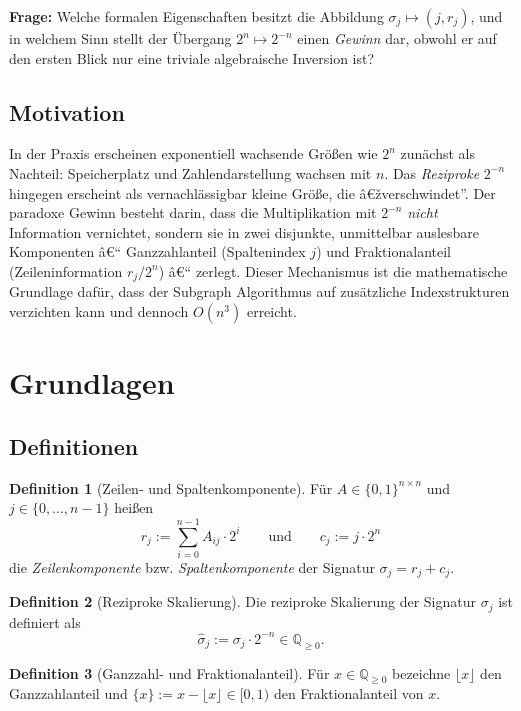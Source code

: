 ﻿\documentclass[a4paper,12pt]{article}
\theoremstyle{definition}
\newtheorem{definition}{Definition}
\begin{document}
\textbf{Frage:} Welche formalen Eigenschaften besitzt die Abbildung
$\sigma_j \mapsto (j, r_j)$, und in welchem Sinn stellt der Übergang
$2^n \mapsto 2^{-n}$ einen \emph{Gewinn} dar, obwohl er auf den ersten Blick
nur eine triviale algebraische Inversion ist?

\subsection{Motivation}

In der Praxis erscheinen exponentiell wachsende Größen wie $2^n$ zunächst
als Nachteil: Speicherplatz und Zahlendarstellung wachsen mit $n$. Das
\emph{Reziproke} $2^{-n}$ hingegen erscheint als vernachlässigbar kleine Größe,
die â€žverschwindet''. Der paradoxe Gewinn besteht darin, dass die
Multiplikation mit $2^{-n}$ \emph{nicht} Information vernichtet, sondern
sie in zwei disjunkte, unmittelbar auslesbare Komponenten â€“ Ganzzahlanteil
(Spaltenindex $j$) und Fraktionalanteil (Zeileninformation $r_j / 2^n$) â€“
zerlegt. Dieser Mechanismus ist die mathematische Grundlage dafür, dass der
Subgraph Algorithmus auf zusätzliche Indexstrukturen verzichten kann und
dennoch $O(n^3)$ erreicht.

\section{Grundlagen}

\subsection{Definitionen}

\begin{definition}[Zeilen- und Spaltenkomponente]
	Für $A \in \{0,1\}^{n\times n}$ und $j \in \{0,\ldots,n-1\}$ heißen
	\[
		r_j := \sum_{i=0}^{n-1} A_{ij}\cdot 2^i
		\qquad\text{und}\qquad
		c_j := j \cdot 2^n
	\]
	die \emph{Zeilenkomponente} bzw. \emph{Spaltenkomponente} der Signatur
	$\sigma_j = r_j + c_j$.
\end{definition}

\begin{definition}[Reziproke Skalierung]
	Die reziproke Skalierung der Signatur $\sigma_j$ ist definiert als
	\[
		\hat\sigma_j := \sigma_j \cdot 2^{-n} \in \mathbb{Q}_{\geq 0}.
	\]
\end{definition}

\begin{definition}[Ganzzahl- und Fraktionalanteil]
	Für $x \in \mathbb{Q}_{\geq 0}$ bezeichne $\lfloor x \rfloor$ den
	Ganzzahlanteil und $\{x\} := x - \lfloor x \rfloor \in [0,1)$ den
	Fraktionalanteil von $x$.
\end{definition}
\end{document}
